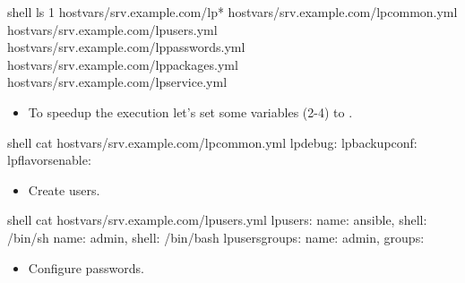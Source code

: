 \documentclass[letterpaper,10pt,english]{sphinxmanual}
\begin{document}
%
\begin{sphinxVerbatim}[commandchars=\\\{\},numbers=left,firstnumber=1,stepnumber=1]
shell\PYGZgt{} ls \PYGZhy{}1 host\PYGZus{}vars/srv.example.com/lp\PYGZhy{}*
host\PYGZus{}vars/srv.example.com/lp\PYGZhy{}common.yml
host\PYGZus{}vars/srv.example.com/lp\PYGZhy{}users.yml
host\PYGZus{}vars/srv.example.com/lp\PYGZhy{}passwords.yml
host\PYGZus{}vars/srv.example.com/lp\PYGZhy{}packages.yml
host\PYGZus{}vars/srv.example.com/lp\PYGZhy{}service.yml
\end{sphinxVerbatim}
\sphinxresetverbatimhllines
\begin{itemize}
\item {} 
To speedup the execution let’s set some variables (2-4) to .

\end{itemize}

%
\begin{sphinxVerbatim}[commandchars=\\\{\},numbers=left,firstnumber=1,stepnumber=1]
shell\PYGZgt{} cat host\PYGZus{}vars/srv.example.com/lp\PYGZhy{}common.yml
lp\PYGZus{}debug: 
lp\PYGZus{}backup\PYGZus{}conf: 
lp\PYGZus{}flavors\PYGZus{}enable: 
\end{sphinxVerbatim}
\sphinxresetverbatimhllines
\begin{itemize}
\item {} 
Create users.

\end{itemize}

%
\begin{sphinxVerbatim}[commandchars=\\\{\},numbers=left,firstnumber=1,stepnumber=1]
shell\PYGZgt{} cat host\PYGZus{}vars/srv.example.com/lp\PYGZhy{}users.yml
lp\PYGZus{}users:
  \PYGZhy{} name: ansible,
     shell: /bin/sh
  \PYGZhy{} name: admin,
     shell: /bin/bash
lp\PYGZus{}users\PYGZus{}groups:
  \PYGZhy{} name: admin,
     groups: 
\end{sphinxVerbatim}
\sphinxresetverbatimhllines
\begin{itemize}
\item {} 
Configure passwords.

\end{itemize}
\end{document}
